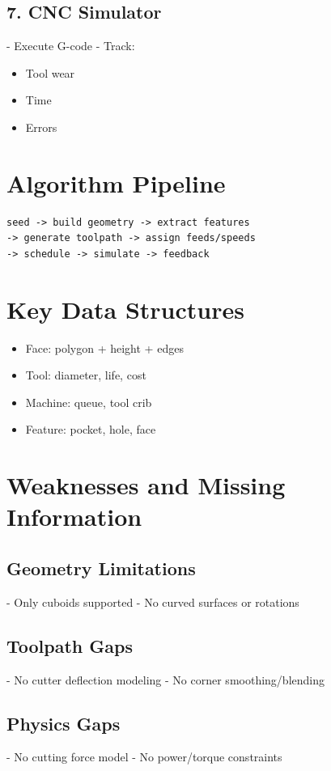 \documentclass{article}
\begin{document}
\subsection{7. CNC Simulator}
- Execute G-code
- Track:
\begin{itemize}
\item Tool wear
\item Time
\item Errors
\end{itemize}

\section{Algorithm Pipeline}
\begin{verbatim}
seed -> build geometry -> extract features
-> generate toolpath -> assign feeds/speeds
-> schedule -> simulate -> feedback
\end{verbatim}

\section{Key Data Structures}
\begin{itemize}
\item Face: polygon + height + edges
\item Tool: diameter, life, cost
\item Machine: queue, tool crib
\item Feature: pocket, hole, face
\end{itemize}

\section{Weaknesses and Missing Information}

\subsection{Geometry Limitations}
- Only cuboids supported
- No curved surfaces or rotations

\subsection{Toolpath Gaps}
- No cutter deflection modeling
- No corner smoothing/blending

\subsection{Physics Gaps}
- No cutting force model
- No power/torque constraints
\end{document}
